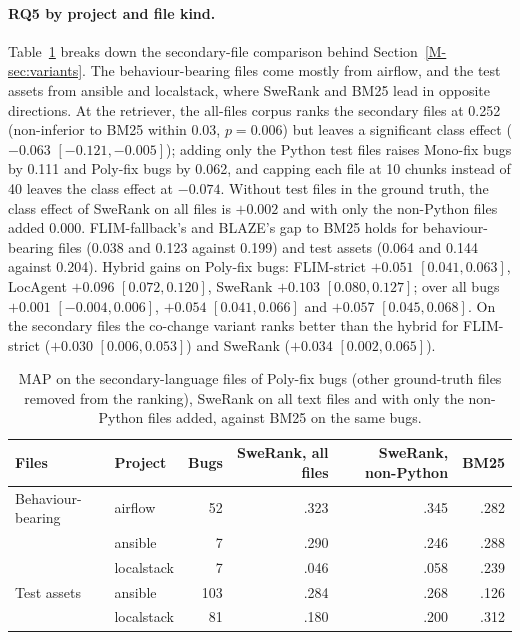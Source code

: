 \documentclass[10pt,a4paper]{article}
\begin{document}


\paragraph{RQ5 by project and file kind.} Table~\ref{tab:rq5proj} breaks down the
secondary-file comparison behind Section~\ref{M-sec:variants}. The
behaviour-bearing files come mostly from airflow, and the test assets from
ansible and localstack, where SweRank and BM25 lead in opposite directions. At
the retriever, the all-files corpus ranks the secondary files at 0.252
(non-inferior to BM25 within 0.03, $p=0.006$) but leaves a significant class
effect ($-0.063$ $[-0.121, -0.005]$); adding only the Python test files raises
Mono-fix bugs by 0.111 and Poly-fix bugs by 0.062, and capping each file at 10
chunks instead of 40 leaves the class effect at $-0.074$. Without test files in
the ground truth, the class effect of SweRank on all files is $+0.002$ and with
only the non-Python files added $0.000$. FLIM-fallback's and BLAZE's gap to BM25
holds for behaviour-bearing files (0.038 and 0.123 against 0.199) and test
assets (0.064 and 0.144 against 0.204). Hybrid gains on Poly-fix bugs: FLIM-strict
$+0.051$ $[0.041, 0.063]$, LocAgent $+0.096$ $[0.072, 0.120]$, SweRank $+0.103$
$[0.080, 0.127]$; over all bugs $+0.001$ $[-0.004, 0.006]$, $+0.054$
$[0.041, 0.066]$ and $+0.057$ $[0.045, 0.068]$. On the secondary files the
co-change variant ranks better than the hybrid for FLIM-strict ($+0.030$
$[0.006, 0.053]$) and SweRank ($+0.034$ $[0.002, 0.065]$).

\begin{table}[t]
\caption{MAP on the secondary-language files of Poly-fix bugs (other ground-truth files removed from the ranking), SweRank on all text files and with only the non-Python files added, against BM25 on the same bugs.}
\label{tab:rq5proj}
\small
\begin{tabular}{llrrrr}
\toprule
Files & Project & Bugs & SweRank, all files & SweRank, non-Python & BM25 \\
\midrule
Behaviour-bearing & airflow & 52 & .323 & .345 & .282 \\
 & ansible & 7 & .290 & .246 & .288 \\
 & localstack & 7 & .046 & .058 & .239 \\
Test assets & ansible & 103 & .284 & .268 & .126 \\
 & localstack & 81 & .180 & .200 & .312 \\
\bottomrule
\end{tabular}
\end{table}
\end{document}
